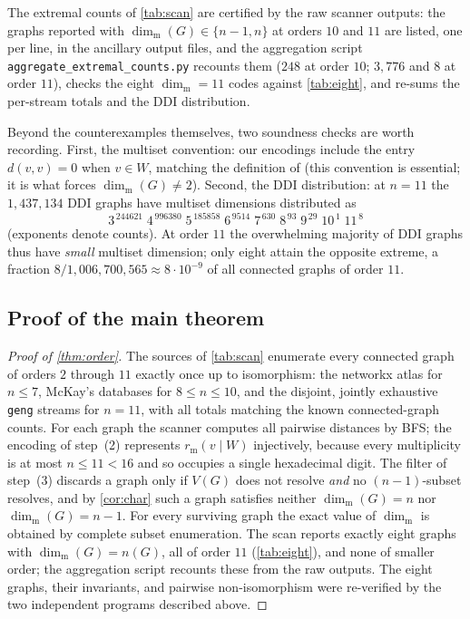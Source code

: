 \documentclass[11pt]{amsart}
\theoremstyle{remark}
\newcommand{\mdim}{\operatorname{dim}_{\mathrm m}}
\newcommand{\dist}{d}
\begin{document}
The extremal counts of \cref{tab:scan} are certified by the raw scanner outputs: the graphs reported with $\mdim(G)\in\{n-1,n\}$ at orders $10$ and $11$ are listed, one per line, in the ancillary output files, and the aggregation script \texttt{aggregate\_extremal\_counts.py} recounts them ($248$ at order $10$; $3{,}776$ and $8$ at order $11$), checks the eight $\mdim=11$ codes against \cref{tab:eight}, and re-sums the per-stream totals and the DDI distribution.

Beyond the counterexamples themselves, two soundness checks are worth recording.  First, the multiset convention: our encodings include the entry $\dist(v,v)=0$ when $v\in W$, matching the definition of \cite{SimanjuntakEtAl} (this convention is essential; it is what forces $\mdim(G)\neq 2$).  Second, the DDI distribution: at $n=11$ the $1{,}437{,}134$ DDI graphs have multiset dimensions distributed as
\[
3^{\,244621}\;4^{\,996380}\;5^{\,185858}\;6^{\,9514}\;7^{\,630}\;8^{\,93}\;9^{\,29}\;10^{\,1}\;11^{\,8}
\]
(exponents denote counts).  At order $11$ the overwhelming majority of DDI graphs thus have \emph{small} multiset dimension; only eight attain the opposite extreme, a fraction $8/1{,}006{,}700{,}565\approx 8\cdot 10^{-9}$ of all connected graphs of order $11$.

\subsection{Proof of the main theorem}
\begin{proof}[Proof of \cref{thm:order}]
The sources of \cref{tab:scan} enumerate every connected graph of orders $2$ through $11$ exactly once up to isomorphism: the \textsf{networkx} atlas for $n\le7$, McKay's databases for $8\le n\le10$, and the disjoint, jointly exhaustive \texttt{geng} streams for $n=11$, with all totals matching the known connected-graph counts.  For each graph the scanner computes all pairwise distances by BFS; the encoding of step~(2) represents $r_{\mathrm m}(v\mid W)$ injectively, because every multiplicity is at most $n\le11<16$ and so occupies a single hexadecimal digit.  The filter of step~(3) discards a graph only if $V(G)$ does not resolve \emph{and} no $(n-1)$-subset resolves, and by \cref{cor:char} such a graph satisfies neither $\mdim(G)=n$ nor $\mdim(G)=n-1$.  For every surviving graph the exact value of $\mdim$ is obtained by complete subset enumeration.  The scan reports exactly eight graphs with $\mdim(G)=n(G)$, all of order $11$ (\cref{tab:eight}), and none of smaller order; the aggregation script recounts these from the raw outputs.  The eight graphs, their invariants, and pairwise non-isomorphism were re-verified by the two independent programs described above.
\end{proof}
\end{document}
